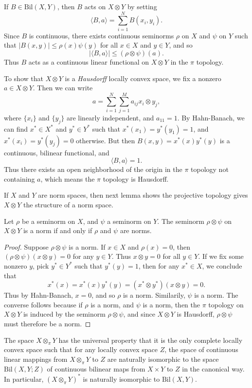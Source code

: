 If $B \in \text{Bil}(X,Y)$, then $B$ acts on $X \otimes Y$ by setting
%
\[ \langle B, a \rangle = \sum_{i = 1}^N B(x_i,y_i). \]
%
Since $B$ is continuous, there exists continuous seminorms $\rho$ on $X$ and $\psi$ on $Y$ such that $|B(x,y)| \leq \rho(x) \psi(y)$ for all $x \in X$ and $y \in Y$, and so
%
\[ |\langle B, a \rangle| \leq (\rho \otimes \psi)(a). \]
%
Thus $B$ acts as a continuous linear functional on $X \otimes Y$ in the $\pi$ topology.

To show that $X \otimes Y$ is a \emph{Hausdorff} locally convex space, we fix a nonzero $a \in X \otimes Y$. Then we can write
%
\[ a = \sum_{i = 1}^N \sum_{j = 1}^M a_{ij} x_i \otimes y_j, \]
%
where $\{ x_i \}$ and $\{ y_j \}$ are linearly independent, and $a_{11} = 1$. By Hahn-Banach, we can find $x^* \in X^*$ and $y^* \in Y^*$ such that $x^*(x_1) = y^*(y_1) = 1$, and $x^*(x_i) = y^*(y_j) = 0$ otherwise. But then $B(x,y) = x^*(x) y^*(y)$ is a continuous, bilinear functional, and
%
\[ \langle B, a \rangle = 1. \]
%
Thus there exists an open neighborhood of the origin in the $\pi$ topology not containing $a$, which means the $\pi$ topology is Hausdorff.

If $X$ and $Y$ are norm spaces, then next lemma shows the projective topology gives $X \otimes Y$ the structure of a norm space.

\begin{lemma}
    Let $\rho$ be a seminorm on $X$, and $\psi$ a seminorm on $Y$. The seminorm $\rho \otimes \psi$ on $X \otimes Y$ is a norm if and only if $\rho$ and $\psi$ are norms.
\end{lemma}
\begin{proof}
    Suppose $\rho \otimes \psi$ is a norm. If $x \in X$ and $\rho(x) = 0$, then $(\rho \otimes \psi)(x \otimes y) = 0$ for any $y \in Y$. Thus $x \otimes y = 0$ for all $y \in Y$. If we fix some nonzero $y$, pick $y^* \in Y^*$ such that $y^*(y) = 1$, then for any $x^* \in X$, we conclude that
    \[ x^*(x) = x^*(x) y^*(y) = (x^* \otimes y^*)(x \otimes y) = 0. \]
    Thus by Hahn-Banach, $x = 0$, and so $\rho$ is a norm. Similarily, $\psi$ is a norm. The converse follows because if $\rho$ is a norm, and $\psi$ is a norm, then the $\pi$ topology on $X \otimes Y$ is induced by the seminorm $\rho \otimes \psi$, and since $X \otimes Y$ is Hausdorff, $\rho \otimes \psi$ must therefore be a norm.
\end{proof}

The space $X \otimes_\pi Y$ has the universal property that it is the only complete locally convex space such that for any locally convex space $Z$, the space of continuous linear mappings from $X \otimes_\pi Y$ to $Z$ are naturally isomorphic to the space $\text{Bil}(X,Y;Z)$ of continuous bilinear maps from $X \times Y$ to $Z$ in the canonical way. In particular, $(X \otimes_\pi Y)^*$ is naturally isomorphic to $\text{Bil}(X,Y)$.

